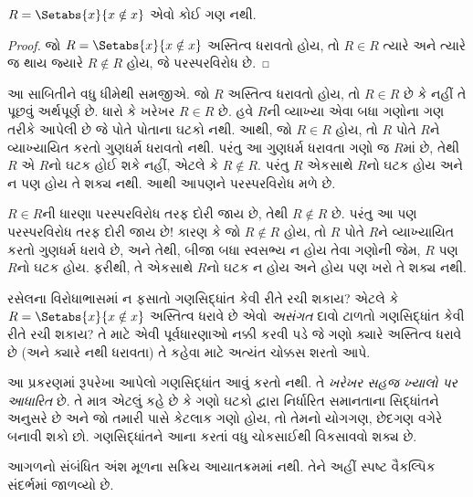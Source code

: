 \begin{thm}[રસેલનો વિરોધાભાસ]
	$R = \Setabs{x}{x \notin x}$ એવો કોઈ ગણ નથી.
\end{thm}

\begin{proof}
જો $R = \Setabs{x}{x \notin x}$ અસ્તિત્વ ધરાવતો હોય, તો
$R \in R$ ત્યારે અને ત્યારે જ થાય જ્યારે $R \notin R$ હોય,
જે પરસ્પરવિરોધ છે.
\end{proof}

\begin{explain}
આ સાબિતીને વધુ ધીમેથી સમજીએ. જો $R$ અસ્તિત્વ ધરાવતો હોય, તો
$R \in R$ છે કે નહીં તે પૂછવું અર્થપૂર્ણ છે.
ધારો કે ખરેખર $R \in R$ છે. હવે $R$ની વ્યાખ્યા એવા બધા ગણોના ગણ
તરીકે આપેલી છે જે પોતે પોતાના ઘટકો નથી.
આથી, જો $R \in R$ હોય, તો $R$ પોતે $R$ને વ્યાખ્યાયિત કરતો ગુણધર્મ ધરાવતો નથી.
પરંતુ આ ગુણધર્મ ધરાવતા ગણો જ $R$માં છે, તેથી $R$ એ $R$નો
ઘટક હોઈ શકે નહીં, એટલે કે $R \notin R$.
પરંતુ $R$ એકસાથે $R$નો ઘટક હોય અને ન પણ હોય તે શક્ય નથી.
આથી આપણને પરસ્પરવિરોધ મળે છે.

$R \in R$ની ધારણા પરસ્પરવિરોધ તરફ દોરી જાય છે, તેથી $R \notin R$ છે.
પરંતુ આ પણ પરસ્પરવિરોધ તરફ દોરી જાય છે!{}
કારણ કે જો $R \notin R$ હોય, તો $R$ પોતે $R$ને વ્યાખ્યાયિત કરતો ગુણધર્મ
ધરાવે છે, અને તેથી, બીજા બધા સ્વસભ્ય ન હોય તેવા ગણોની જેમ,
$R$ પણ $R$નો ઘટક હોય.
ફરીથી, તે એકસાથે $R$નો ઘટક ન હોય અને હોય પણ ખરો તે શક્ય નથી.
\end{explain}

\begin{digress}
રસેલના વિરોધાભાસમાં ન ફસાતો ગણસિદ્ધાંત કેવી રીતે રચી શકાય?
એટલે કે $R = \Setabs{x}{x \notin x}$ અસ્તિત્વ ધરાવે છે એવો
\emph{અસંગત} દાવો ટાળતો ગણસિદ્ધાંત કેવી રીતે રચી શકાય?
તે માટે એવી પૂર્વધારણાઓ નક્કી કરવી પડે જે ગણો ક્યારે અસ્તિત્વ ધરાવે
છે (અને ક્યારે નથી ધરાવતા) તે કહેવા માટે અત્યંત ચોક્કસ શરતો આપે.

આ પ્રકરણમાં રૂપરેખા આપેલો ગણસિદ્ધાંત આવું કરતો નથી.
તે \emph{ખરેખર સહજ ખ્યાલો પર આધારિત} છે.
તે માત્ર એટલું કહે છે કે ગણો ઘટકો દ્વારા નિર્ધારિત સમાનતાના સિદ્ધાંતને
અનુસરે છે અને જો તમારી પાસે કેટલાક ગણો હોય, તો તેમનો યોગગણ,
છેદગણ વગેરે બનાવી શકો છો.
ગણસિદ્ધાંતને આના કરતાં વધુ ચોકસાઈથી વિકસાવવો શક્ય છે.

\end{digress}
\endgroup


\OLEndChapterHook


\begin{editorial}
આગળનો સંબંધિત અંશ મૂળના સક્રિય આયાતક્રમમાં નથી. તેને અહીં સ્પષ્ટ વૈકલ્પિક સંદર્ભમાં જાળવ્યો છે.
\end{editorial}
\begingroup
\makeatletter{}\makeatother

